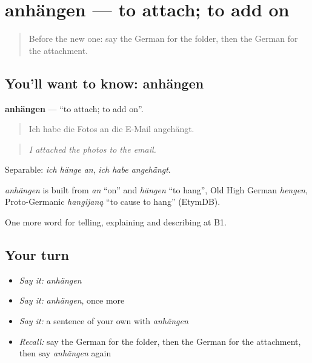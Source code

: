 \section[anhängen]{anhängen — to attach; to add on}

\label{lesson:GE-C393-anhaengen}



\begin{quote}
Before the new one: say the German for the folder, then the German for the attachment.
\end{quote}

\subsection*{You'll want to know: anhängen}
\textbf{anhängen} — \textquotedblleft{}to attach; to add on\textquotedblright{}.

\begin{quote}
Ich habe die Fotos an die E-Mail angehängt.
\end{quote}

\begin{quote}
\emph{I attached the photos to the email.}
\end{quote}

Separable: \emph{ich hänge an}, \emph{ich habe angehängt}.

\begin{cousinweb}
\emph{anhängen} is built from \emph{an} \textquotedblleft{}on\textquotedblright{} and \emph{hängen} \textquotedblleft{}to hang\textquotedblright{}, Old High German \emph{hengen}, Proto-Germanic \emph{hangijaną} \textquotedblleft{}to cause to hang\textquotedblright{} (EtymDB).
\end{cousinweb}

\begin{grammarlens}[title={What you've built}]
One more word for telling, explaining and describing at B1.
\end{grammarlens}

\subsection*{Your turn}
\begin{itemize}
\raggedright
  \item \emph{Say it:} \emph{anhängen}
  \item \emph{Say it:} \emph{anhängen}, once more
  \item \emph{Say it:} a sentence of your own with \emph{anhängen}
  \item \emph{Recall:} say the German for the folder, then the German for the attachment, then say \emph{anhängen} again
\end{itemize}

